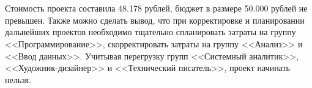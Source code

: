 \chapter*{\hfill{}\hfill}

Стоимость проекта составила 48.178 рублей, бюджет в размере 50.000 рублей не превышен.
Также можно сделать вывод, что при корректировке и планировании дальнейших проектов необходимо тщательно спланировать затраты на группу <<Программирование>>, скорректировать затраты на группу <<Анализ>> и <<Ввод данных>>.
Учитывая перегрузку групп <<Системный аналитик>>, <<Художник-дизайнер>> и <<Технический писатель>>, проект начинать нельзя.